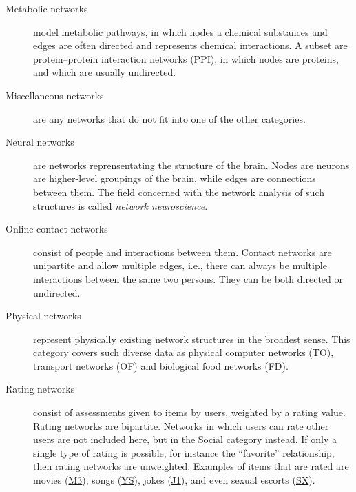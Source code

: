 \documentclass{article}
\begin{document}
\begin{description}
\item[Metabolic networks] model metabolic pathways,
   in which nodes a chemical substances
  and edges are often directed and represents chemical interactions.  A
  subset are protein--protein interaction networks (PPI), in which nodes
  are proteins, and which are usually undirected.

\item[Miscellaneous networks] are any networks that do not fit into one
  of the other categories. 

\item[Neural networks] are networks reprensentating the structure of the
  brain.  Nodes are neurons are higher-level groupings of the brain,
  while edges are connections between them.  The field concerned with
  the network analysis of such structures is called \emph{network
  neuroscience}. 
  
\item[Online contact networks] consist of people and interactions between
   them.  Contact networks are
  unipartite and allow multiple edges, i.e., there can always be
  multiple interactions between the same two persons.  They can be both
  directed or undirected.

\item[Physical networks] represent physically existing network
   structures in the broadest sense.  This
  category covers such diverse data as physical computer networks
  (\href{http://konect.cc/networks/topology/}{\textsf{TO}}), transport
  networks
  (\href{http://konect.cc/networks/opsahl-openflights/}{\textsf{OF}}) and
  biological food networks
  (\href{http://konect.cc/networks/foodweb-baydry/}{\textsf{FD}}).

\item[Rating networks] consist of assessments given to items by users,
   weighted by a rating value.  Rating
  networks are bipartite.  Networks in which users can rate other users
  are not included here, but in the Social category instead.  If only a
  single type of rating is possible, for instance the ``favorite''
  relationship, then rating networks are unweighted.  Examples of items
  that are rated are movies
  (\href{http://konect.cc/networks/movielens-10m_rating/}{\textsf{M3}}),
  songs (\href{http://konect.cc/networks/yahoo-song/}{\textsf{YS}}),
  jokes (\href{http://konect.cc/networks/jester1/}{\textsf{J1}}), and even
  sexual escorts
  (\href{http://konect.cc/networks/escorts/}{\textsf{SX}}).


\end{description}
\end{document}
